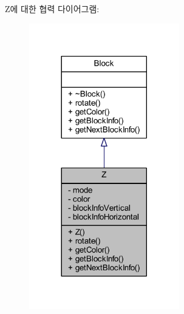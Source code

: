 Z에 대한 협력 다이어그램\+:
\nopagebreak
\begin{figure}[H]
\begin{center}
\leavevmode
\includegraphics[width=185pt]{class_z__coll__graph}
\end{center}
\end{figure}
